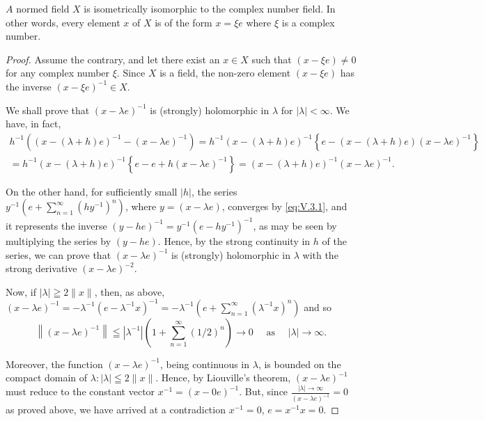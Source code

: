 \begin{theorem}\label{thm:V.3.Theorem.2} $A$ normed field $X$ is isometrically isomorphic to the complex number field. In other words, every element $x$ of $X$ is of the form $x = \xi e$ where $\xi$ is a complex number. 

\end{theorem}

\begin{proof}
 Assume the contrary, and let there exist an $x \in X$ such that $(x - \xi e) \neq 0$ for any complex number $\xi$. Since $X$ is a field, the non-zero element $(x - \xi e)$ has the inverse $(x - \xi e)^{-1} \in X$. 

We shall prove that $(x - \lambda e)^{-1}$ is (strongly) holomorphic in $\lambda$ for $|\lambda| < \infty$. We have, in fact, 
\[
\begin{gathered}
h ^{-1} ((x - (\lambda + h) e) ^{-1} - (x - \lambda e) ^{-1}) = h ^{-1} (x - (\lambda + h) e) ^{-1} \left\{e - (x - (\lambda + h) e) (x - \lambda e) ^{-1} \right\}
\\
= h ^{-1} (x - (\lambda + h) e) ^{-1} \left\{e - e + h (x - \lambda e) ^{-1} \right\} = (x - (\lambda + h) e) ^{-1} (x - \lambda e) ^{-1}.
\end{gathered}
\]

On the other hand, for sufficiently small $|h|$, the series $y^{-1}\left(e + \sum\limits_{n=1}^{\infty}(hy^{-1})^{n}\right)$, where $y = (x - \lambda e)$, converges by \eqref{eq:V.3.1}, and it represents the inverse $(y - he)^{-1} = y^{-1}(e - hy^{-1})^{-1}$, as may be seen by multiplying the series by $(y - he)$. Hence, by the strong continuity in $h$ of the series, we can prove that $(x - \lambda e)^{-1}$ is (strongly) holomorphic in $\lambda$ with the strong derivative $(x - \lambda e)^{-2}$. 

Now, if $|\lambda| \geqq 2\|x\|$, then, as above, $(x - \lambda e)^{-1} = -\lambda^{-1}(e - \lambda^{-1}x)^{-1} = -\lambda^{-1}\left(e + \sum\limits_{n=1}^{\infty}(\lambda^{-1}x)^n\right)$ and so 
\[
\left\| (x - \lambda e) ^{-1} \right\| \leqq \left| \lambda^{-1} \right|\left(1 + \sum\limits_{n=1} ^{\infty} (1 / 2) ^{n}\right)\rightarrow 0 \quad \text{ as } \quad | \lambda | \rightarrow \infty .
\]

Moreover, the function $(x - \lambda e)^{-1}$, being continuous in $\lambda$, is bounded on the compact domain of $\lambda: |\lambda| \leqq 2 \|x\|$. Hence, by Liouville's theorem, $(x - \lambda e)^{-1}$ must reduce to the constant vector $x^{-1} = (x - 0e)^{-1}$. But, since \slim $\frac{|\lambda| \to \infty}{(x - \lambda e)^{-1}} = 0$ as proved above, we have arrived at a contradiction $x^{-1} = 0$, $e = x^{-1}x = 0$. 
\end{proof}


